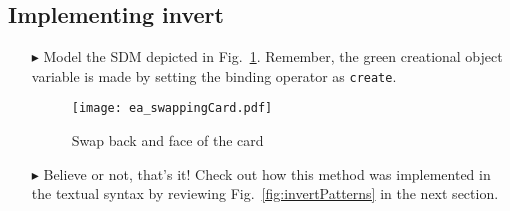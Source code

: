 \newpage
\subsection{Implementing invert}
\visHeader
\hypertarget{invertCard vis}{}

\begin{itemize}

\item[$\blacktriangleright$] Model the SDM depicted in Fig.~\ref{fig:sdm_invert}. Remember, the green creational object variable is made by setting the binding
operator as \texttt{create}.


\vspace{1cm}

\begin{figure}[htbp]
\begin{center}
  \texttt{[image: ea\_swappingCard.pdf]}
  \caption{Swap back and face of the card}  
  \label{fig:sdm_invert}
\end{center}
\end{figure}

\item[$\blacktriangleright$] Believe or not, that's it! Check out how this method was implemented in the textual syntax by reviewing
Fig.~\ref{fig:invertPatterns} in the next section.

\end{itemize}
